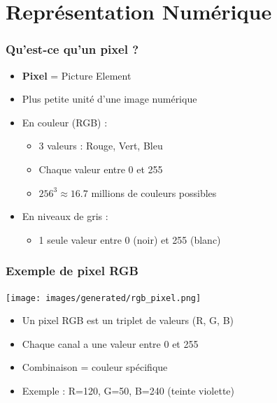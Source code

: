 \documentclass{beamer}
\begin{document}
\section{Représentation Numérique}

\begin{frame}
    \frametitle{Qu'est-ce qu'un pixel ?}
    \begin{itemize}
        \item \textbf{Pixel} = Picture Element
        \item Plus petite unité d'une image numérique
        \item En couleur (RGB) :
        \begin{itemize}
            \item 3 valeurs : Rouge, Vert, Bleu
            \item Chaque valeur entre 0 et 255
            \item \(256^3 \approx 16.7\) millions de couleurs possibles
        \end{itemize}
        \item En niveaux de gris :
        \begin{itemize}
            \item 1 seule valeur entre 0 (noir) et 255 (blanc)
        \end{itemize}
    \end{itemize}
\end{frame}

\begin{frame}
    \frametitle{Exemple de pixel RGB}
    \begin{center}
        \texttt{[image: images/generated/rgb\_pixel.png]}
    \end{center}
    \begin{itemize}
        \item Un pixel RGB est un triplet de valeurs (R, G, B)
        \item Chaque canal a une valeur entre 0 et 255
        \item Combinaison = couleur spécifique
        \item Exemple : R=120, G=50, B=240 (teinte violette)
    \end{itemize}
\end{frame}
\end{document}
